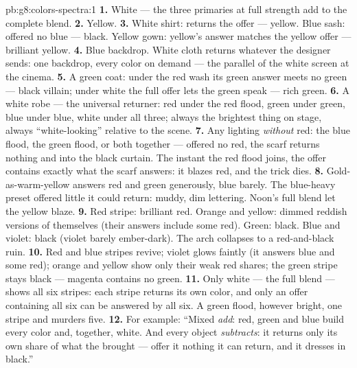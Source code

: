 \begin{solution}{pb:g8:colors-spectra:1}
\textbf{1.} White --- the three primaries at full strength add
to the complete blend.
\textbf{2.} Yellow.
\textbf{3.} White shirt: returns the offer --- yellow. Blue
sash: offered no blue --- black. Yellow gown: yellow's answer
matches the yellow offer --- brilliant yellow.
\textbf{4.} Blue backdrop. White cloth returns whatever the
designer sends: one backdrop, every color on demand --- the
parallel of the white screen at the cinema.
\textbf{5.} A green coat: under the red wash its green answer
meets no green --- black villain; under white  the full
offer lets the green speak --- rich green.
\textbf{6.} A white robe --- the universal returner: red under
the red flood, green under green, blue under blue, white under
all three; always the brightest thing on stage, always
``white-looking'' relative to the scene.
\textbf{7.} Any lighting \emph{without} red: the blue flood,
the green flood, or both together --- offered no red, the
scarf returns nothing and  into the black curtain. The
instant the red flood joins, the offer contains exactly what
the scarf answers: it blazes red, and the trick dies.
\textbf{8.} Gold-as-warm-yellow answers red and green
generously, blue barely. The blue-heavy preset offered
little it could return: muddy, dim lettering. Noon's full
blend let the yellow blaze.
\textbf{9.} Red stripe: brilliant red. Orange and yellow:
dimmed reddish versions of themselves (their answers include
some red). Green: black. Blue and violet: black (violet
barely ember-dark). The arch collapses to a red-and-black
ruin.
\textbf{10.} Red and blue stripes revive; violet glows
faintly (it answers blue and some red); orange and yellow
show only their weak red shares; the green stripe stays
black --- magenta  contains no green.
\textbf{11.} Only white  --- the full blend --- shows
all six stripes: each stripe returns its own color, and only
an offer containing all six can be answered by all six. A
green flood, however bright,  one stripe and murders
five.
\textbf{12.} For example: ``Mixed  \emph{add}: red,
green and blue build every color and, together, white.
And every object \emph{subtracts}: it returns only its own
share of what the  brought --- offer it nothing it can
return, and it dresses in black.''
\end{solution}
